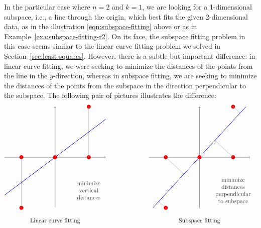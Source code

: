 In the particular case where $n=2$ and $k=1$, we are looking for a
1-dimensional subspace, i.e., a line through the origin, which best
fits the given 2-dimensional data, as in the illustration
{\eqref{eqn:subspace-fitting}} above or as in
Example~\ref{exa:subspace-fitting-r2}. On its face, the subspace
fitting problem in this case seems similar to the linear curve fitting
problem we solved in Section~\ref{sec:least-squares}. However, there
is a subtle but important difference: in linear curve fitting, we were
seeking to minimize the distances of the points from the line in the
$y$-direction, whereas in subspace fitting, we are seeking to minimize
the distances of the points from the subspace in the direction
perpendicular to the subspace. The following pair of pictures
illustrates the difference:
\begin{equation*}
  \begin{tikzpicture}[scale=1]
    \draw[thin,->] (-3,0) -- (3,0);
    \draw[thin,->] (0,-3) -- (0,3);
    \draw[thick,blue] (-3,-3*0.75) -- (3,3*0.75);
    \fill[color=red] (0,0) circle (0.12);
    \fill[color=red] (2,0) circle (0.12);
    \fill[color=red] (2,3) circle (0.12);
    \fill[color=red] (-2,0) circle (0.12);
    \fill[color=red] (-2,-3) circle (0.12);
    \draw[<->,black!50] (2,0) -- (2,1.5);
    \draw[<->,black!50] (2,3) -- (2,1.5);
    \draw[<->,black!50] (-2,0) -- (-2,-1.5);
    \draw[<->,black!50] (-2,-3) -- (-2,-1.5);
    \path (0,-3.5) node[below] {Linear curve fitting};
    \path[black!70] (2,-2) node {\begin{tabular}{c}minimize\\vertical\\distances\end{tabular}};
  \end{tikzpicture}
  \hspace{1in}
  \begin{tikzpicture}[scale=1]
    \draw[thin,->] (-3,0) -- (3,0);
    \draw[thin,->] (0,-3) -- (0,3);
    \draw[thick,blue] (-3*0.92,-3) -- (3*0.92, 3);
    \fill[color=red] (0,0) circle (0.12);
    \fill[color=red] (2,0) circle (0.12);
    \fill[color=red] (2,3) circle (0.12);
    \fill[color=red] (-2,0) circle (0.12);
    \fill[color=red] (-2,-3) circle (0.12);
    \draw[<->,black!50] (2,0) -- (0.997*0.92,0.997); 
    \draw[<->,black!50] (2,3) -- (2.621*0.92,2.621); 
    \draw[<->,black!50] (-2,0) -- (-0.997*0.92,-0.997); 
    \draw[<->,black!50] (-2,-3) -- (-2.621*0.92,-2.621); 
    \path (0,-3.5) node[below] {Subspace fitting};
    \path[black!70] (2,-2) node {\begin{tabular}{c}minimize\\distances\\perpendicular\\to subspace\end{tabular}};
  \end{tikzpicture}
\end{equation*}

